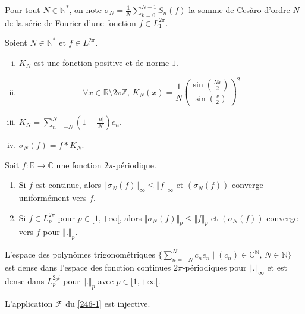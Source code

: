 	\begin{notation}
		Pour tout $N \in \mathbb{N}^*$, on note $\sigma_N = \frac{1}{N} \sum_{k=0}^{N-1} S_n(f)$ la somme de Cesàro d'ordre $N$ de la série de Fourier d'une fonction $f \in L_1^{2 \pi}$.
	\end{notation}

	\begin{proposition}
		Soient $N \in \mathbb{N}^*$ et $f \in L_1^{2 \pi}$.
		\begin{enumerate}[(i)]
			\item $K_N$ est une fonction positive et de norme $1$.
			\item \[ \forall x \in \mathbb{R} \setminus 2 \pi \mathbb{Z}, \, K_N(x) = \frac{1}{N} \left(\frac{\sin \left( \frac{Nx}{2} \right)}{\sin \left( \frac{x}{2} \right)}\right)^2 \]
			\item $K_N = \sum_{n=-N}^{N} \left(1 - \frac{\vert n \vert}{N}\right) e_n$.
			\item $\sigma_N(f) = f * K_N$.
		\end{enumerate}
	\end{proposition}


	\begin{theorem}[Fejér]
		Soit $f : \mathbb{R} \rightarrow \mathbb{C}$ une fonction $2\pi$-périodique.
		\begin{enumerate}
			\item Si $f$ est continue, alors $\Vert \sigma_N(f) \Vert_\infty \leq \Vert f \Vert_\infty$ et $(\sigma_N(f))$ converge uniformément vers $f$.
			\item Si $f \in L_p^{2\pi}$ pour $p \in [1,+\infty[$, alors $\Vert \sigma_N(f) \Vert_p \leq \Vert f \Vert_p$ et $(\sigma_N(f))$ converge vers $f$ pour $\Vert . \Vert_p$.
		\end{enumerate}
	\end{theorem}

	\begin{corollary}
		L'espace des polynômes trigonométriques $\{ \sum_{n=-N}^N c_n e_n \mid (c_n) \in \mathbb{C}^{\mathbb{N}}, \, N \in \mathbb{N} \}$ est dense dans l'espace des fonction continues $2\pi$-périodiques pour $\Vert . \Vert_\infty$ et est dense dans $L_p^{2_pi}$ pour $\Vert . \Vert_p$ avec $p \in [1,+\infty[$.
	\end{corollary}


	\begin{application}
		L'application $\mathcal{F}$ du \cref{246-1} est injective.
	\end{application}


